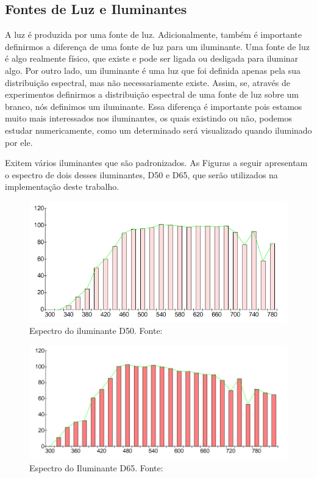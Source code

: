 \documentclass[a4paper,10pt]{report}
\begin{document}
\subsection{Fontes de Luz e Iluminantes}
\par
A luz é produzida por uma fonte de luz. Adicionalmente, também é importante
definirmos a diferença de uma fonte de luz para um iluminante.
Uma fonte de luz é algo realmente físico, que existe e pode ser ligada ou
desligada para iluminar algo. Por outro lado, um iluminante é uma luz que foi
definida apenas pela sua distribuição espectral, mas não necessariamente existe.
Assim, se, através de experimentos definirmos a distribuição espectral de uma
fonte de luz sobre um branco, nós definimos um iluminante. Essa diferença é
importante pois estamos muito mais interessados nos iluminantes, os quais
existindo ou não, podemos estudar numericamente, como um determinado será
visualizado quando iluminado por ele.

\par
Exitem vários iluminantes que são padronizados. As Figuras a seguir apresentam
o espectro de dois desses iluminantes, D50 e D65, que serão utilizados na
implementação deste trabalho.

\begin{figure}[!htb]
     \centering
     \includegraphics[scale=0.6]{img/illuminant_d50.png}
     \caption{Espectro do iluminante D50. Fonte:
}
     \label{fig:illuminant_d50}
\end{figure}

\begin{figure}[!htb]
     \centering
     \includegraphics[scale=0.6]{img/illuminant_d65.png}
     \caption{Espectro do Iluminante D65. Fonte:
}
     \label{fig:illuminant_d65}
\end{figure}
\end{document}
